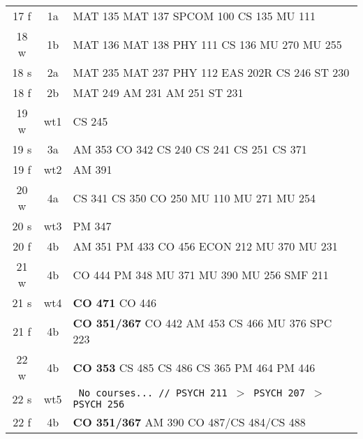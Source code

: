 \documentclass[convert]{standalone}
\begin{document}
\begin{tabular}{|c | c | l |}
	\hline
	17 f & 1a & MAT 135 \quad MAT 137 \quad SPCOM 100 \quad CS 135 \quad MU 111 \\
	18 w & 1b & MAT 136 \quad MAT 138 \quad PHY 111 \quad CS 136 \quad MU 270 \quad MU 255\\
	18 s & 2a & MAT 235 \quad MAT 237 \quad PHY 112 \quad EAS 202R \quad CS 246 \quad ST  230 \\
	18 f & 2b & MAT 249 \quad AM 231 \quad AM 251 \quad ST  231 \\
	19 w & wt1 & CS 245 \\
	19 s & 3a & AM 353 \quad CO 342 \quad CS 240 \quad CS 241 \quad CS 251 \quad CS 371 \\
	19 f & wt2 & AM 391 \\
	20 w & 4a & CS 341 \quad CS 350 \quad CO 250  \quad MU 110 \quad MU 271 \quad MU 254 \\
	20 s & wt3 & PM 347 \\
	20 f & 4b & AM 351  \quad PM 433  \quad CO 456 \quad ECON 212  \quad MU 370 \quad MU 231   \\
	21 w & 4b & CO 444 \quad PM 348   \quad MU 371   \quad MU 390 \quad MU 256 \quad SMF 211 \\
	21 s & wt4 & {\color{red}\textbf{CO 471}} \quad CO 446 \quad   \\
	21 f & 4b &{\color{white} \textbf{CO 351/367}} \quad CO 442  \quad AM 453 \quad CS 466 \quad MU 376 \quad SPC 223      \\
	22 w & 4b & {\color{red} \textbf{CO 353}}  \quad CS 485 \quad CS 486 \quad CS 365 \quad PM 464 \quad PM 446     \\
	22 s & wt5 & {\tt  \color{gray} No courses... // PSYCH 211 $>$ PSYCH 207 $>$ PSYCH 256} \\
	22 f & 4b & {\color{red} \textbf{CO 351/367}} \quad  AM 390 \quad  CO 487/CS 484/CS 488   \\\hline

\end{tabular}
\end{document}
